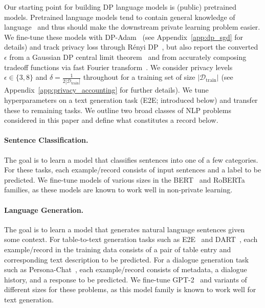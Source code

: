 Our starting point for building DP language models is (public) pretrained models. 
Pretrained language models tend to contain general knowledge of language~\citep{manning2020emergent} and thus should make the downstream private learning problem easier.
We fine-tune these models with DP-Adam~\citep{abadi2016deep,kingma2014adam} (see Appendix~\ref{app:dp_sgd} for details) and track privacy loss through R\'enyi DP~\citep{mironov2017renyi}, but also report the converted $\epsilon$ from a Gaussian DP central limit theorem~\citep{dong2019gaussian} and from accurately composing tradeoff functions via fast Fourier transform~\citep{gopi2021numerical}.
We consider privacy levels $\epsilon \in \{3,8\}$ and $\delta = \tfrac{1}{2 |\mathcal{D}_\text{train}|}$ throughout
for a training set of size $|\mathcal{D}_\text{train}|$ (see Appendix~\ref{app:privacy_accounting} for further details).
We tune hyperparameters on a text generation task (E2E; introduced below) and transfer these to remaining tasks.
We outline two broad classes of NLP problems considered in this paper and define what constitutes a record below.

\paragraph{Sentence Classification.}
The goal is to learn a model that classifies sentences into one of a few categories.
For these tasks, each example/record consists of input sentences and a label to be predicted.
We fine-tune models of various sizes in the BERT~\citep{devlin2018bert} and RoBERTa~\citep{liu2019roberta} families, as these models are known to work well in non-private learning.

\paragraph{Language Generation.}
The goal is to learn a model that generates natural language sentences given some context.
For table-to-text generation tasks such as E2E~\citep{novikova2017e2e} and DART~\citep{nan2020dart}, each example/record in the training data consists of a pair of table entry and corresponding text description to be predicted. 
For a dialogue generation task such as Persona-Chat~\citep{zhang2018personalizing}, each example/record consists of metadata, a dialogue history, and a response to be predicted. 
We fine-tune GPT-2~\citep{radford2019language} and variants of different sizes for these problems, as this model family is known to work well for text generation. 


